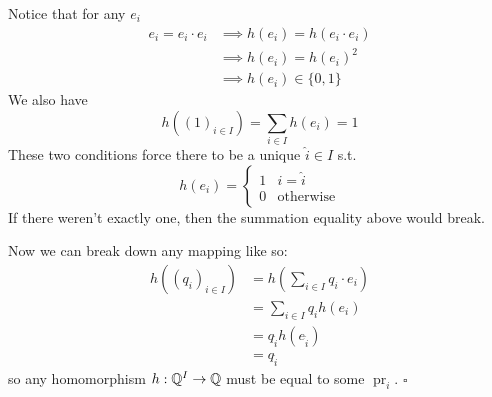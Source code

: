 \documentclass[12pt]{article}
\DeclareMathOperator{\pr}{pr}
\begin{document}
Notice that for any $e_i$
\begin{align*}
  e_i=e_i \cdot e_i
   & \implies h(e_i)=h(e_i \cdot e_i) \\
   & \implies h(e_i)=h(e_i)^2         \\
   & \implies h(e_i) \in \{0, 1\}
\end{align*}
We also have
\[h((1)_{i \in I})=\sum_{i \in I} h(e_i)=1\]
These two conditions force there to be a unique $\hat{i} \in I$ s.t.
\[h(e_i)=\begin{cases}
    1 & i=\hat{i}        \\
    0 & \text{otherwise}
  \end{cases}\]
If there weren't exactly one, then the summation equality above would break.

Now we can break down any mapping like so:
\begin{align*}
  h((q_i)_{i \in I})
   & = h\left(\sum_{i \in I} q_i \cdot e_i\right) \\
   & = \sum_{i \in I} q_i h(e_i)                  \\
   & = q_{\hat{i}} h(e_{\hat{i}})                 \\
   & = q_{\hat{i}}
\end{align*}
so any homomorphism $h: \mathbb{Q}^I \to \mathbb{Q}$ must be equal to some $\pr_i$. $\square$
\end{document}
